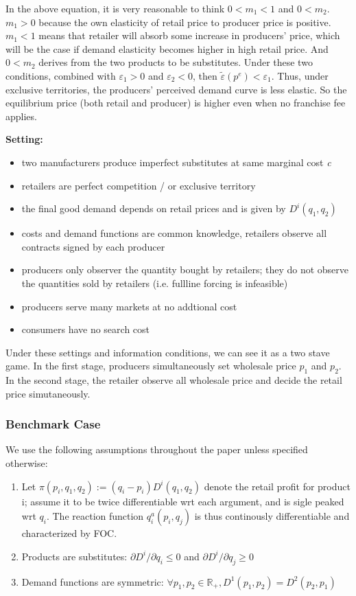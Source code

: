 \documentclass{book}
\theoremstyle{plain}
\theoremstyle{definition}
\newcommand{\R}{\mathbb{R}}			%
\begin{document}
In the above equation, it is very reasonable to think $0<m_1<1$ and $0<m_2$. $m_1>0$ because the own elasticity of retail price to producer price is positive. $m_1<1$ means that retailer will absorb some increase in producers' price, which will be the case if demand elasticity becomes higher in high retail price. And $0<m_2$ derives from the two products to be substitutes. Under these two conditions, combined with $\varepsilon_1>0$ and $\varepsilon_2<0$, then $\tilde\varepsilon(p^e)<\varepsilon_1$. Thus, under exclusive territories, the producers' perceived demand curve is less elastic. So the equilibrium price (both retail and producer) is higher even when no franchise fee applies.

\noindent
\textbf{Setting:}

\begin{itemize}
	\item two manufacturers produce imperfect substitutes at same marginal cost \textit{c}
	\item retailers are perfect competition / or exclusive territory
	\item the final good demand depends on retail prices and is given by $D^i(q_1,q_2)$
	\item costs and demand functions are common knowledge, retailers observe all contracts signed by each producer
	\item producers only observer the quantity bought by retailers; they do not observe the quantities sold by retailers (i.e. fullline forcing is infeasible)
	\item producers serve many markets at no addtional cost
	\item consumers have no search cost
\end{itemize}

Under these settings and information conditions, we can see it as a two stave game. In the first stage, producers simultaneously set wholesale price $p_1$ and $p_2$. In the second stage, the retailer observe all wholesale price and decide the retail price simutaneously.

\subsubsection{Benchmark Case} %
\label{sub:benchmark}

We use the following assumptions throughout the paper unless specified otherwise:

\begin{enumerate}
	\item Let $\pi(p_i,q_1,q_2) := (q_i-p_i)D^i(q_1,q_2)$ denote the retail profit for product i; assume it to be twice differentiable wrt each argument, and is sigle peaked wrt $q_i$. The reaction function $q_i^a(p_i,q_j)$ is thus continously differentiable and characterized by FOC.
	\item Products are substitutes: $\partial D^i/\partial q_i \leq 0$ and $\partial D^i/\partial q_j \geq 0$
	\item Demand functions are symmetric: $\forall p_1,p_2 \in \R_+, D^1(p_1,p_2) = D^2(p_2,p_1)$
\end{enumerate}
\end{document}
